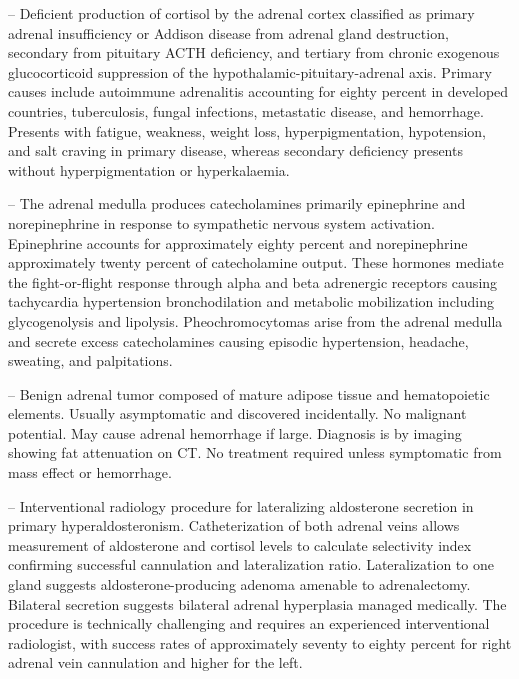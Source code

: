 -- Deficient production of cortisol by the adrenal cortex classified as primary adrenal insufficiency or Addison disease from adrenal gland destruction, secondary from pituitary ACTH deficiency, and tertiary from chronic exogenous glucocorticoid suppression of the hypothalamic-pituitary-adrenal axis. Primary causes include autoimmune adrenalitis accounting for eighty percent in developed countries, tuberculosis, fungal infections, metastatic disease, and hemorrhage. Presents with fatigue, weakness, weight loss, hyperpigmentation, hypotension, and salt craving in primary disease, whereas secondary deficiency presents without hyperpigmentation or hyperkalaemia.

-- The adrenal medulla produces catecholamines primarily epinephrine and norepinephrine in response to sympathetic nervous system activation. Epinephrine accounts for approximately eighty percent and norepinephrine approximately twenty percent of catecholamine output. These hormones mediate the fight-or-flight response through alpha and beta adrenergic receptors causing tachycardia hypertension bronchodilation and metabolic mobilization including glycogenolysis and lipolysis. Pheochromocytomas arise from the adrenal medulla and secrete excess catecholamines causing episodic hypertension, headache, sweating, and palpitations.

-- Benign adrenal tumor composed of mature adipose tissue and hematopoietic elements. Usually asymptomatic and discovered incidentally. No malignant potential. May cause adrenal hemorrhage if large. Diagnosis is by imaging showing fat attenuation on CT. No treatment required unless symptomatic from mass effect or hemorrhage.

-- Interventional radiology procedure for lateralizing aldosterone secretion in primary hyperaldosteronism. Catheterization of both adrenal veins allows measurement of aldosterone and cortisol levels to calculate selectivity index confirming successful cannulation and lateralization ratio. Lateralization to one gland suggests aldosterone-producing adenoma amenable to adrenalectomy. Bilateral secretion suggests bilateral adrenal hyperplasia managed medically. The procedure is technically challenging and requires an experienced interventional radiologist, with success rates of approximately seventy to eighty percent for right adrenal vein cannulation and higher for the left.


